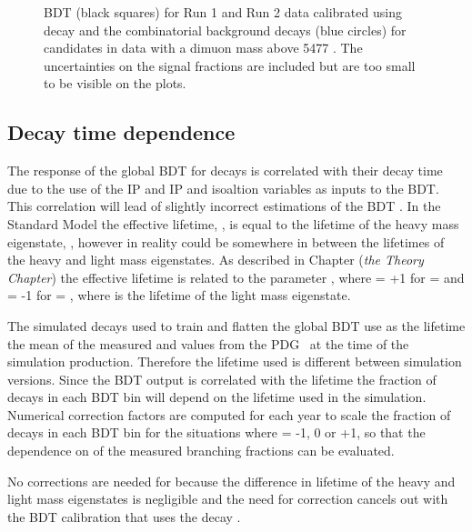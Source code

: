 \begin{figure}[htbp]
\begin{subfigure}[b]{0.48\textwidth}
   \end{subfigure}
    \caption{\bmumu BDT \pdfs (black squares) for Run 1 and Run 2 data calibrated using \bdkpi decay and the combinatorial background decays (blue circles) for \bmumu candidates in data with a dimuon mass above 5477 \mevcc. The uncertainties on the signal fractions are included but are too small to be visible on the plots. }
    \label{fig:BDTpdfs}
\end{figure}


\subsection{Decay time dependence}%
\label{sec:ADGBDTcorrections}
The response of the global BDT for \bmumu decays is correlated with their decay time due to the use of the \bs IP and IP \chisqd and isoaltion variables as inputs to the BDT. This correlation will lead of slightly incorrect estimations of the \bsmumu BDT \pdf. In the Standard Model the \bsmumu effective lifetime, \tmumu, is equal to the lifetime of the heavy \bs mass eigenstate, \tH, however in reality \tmumu could be somewhere in between the lifetimes of the heavy and light mass eigenstates. As described in Chapter ({\it the Theory Chapter}) the \bsmumu effective lifetime is related to the parameter \ADG, where \ADG = +1 for \tmumu = \tH and \ADG = -1 for \tmumu = \tL, where \tL is the lifetime of the light \bsmumu mass eigenstate.

The simulated decays used to train and flatten the global BDT use as the \bsmumu lifetime the mean of the measured \tH and \tL values from the PDG~\cite{Olive:2016xmw} at the time of the simulation production. Therefore the lifetime used is different between simulation versions. Since the BDT output is correlated with the lifetime the fraction of \bsmumu decays in each BDT bin will depend on the lifetime used in the simulation. Numerical correction factors are computed for each year to scale the fraction of \bsmumu decays in each BDT bin for the situations where \ADF = -1, 0 or +1, so that the dependence on \ADG of the measured branching fractions can be evaluated.

No corrections are needed for \bdmumu because the difference in lifetime of the heavy and light \bd mass eigenstates is negligible and the need for correction cancels out with the BDT calibration that uses the \bd decay \bdkpi. 


